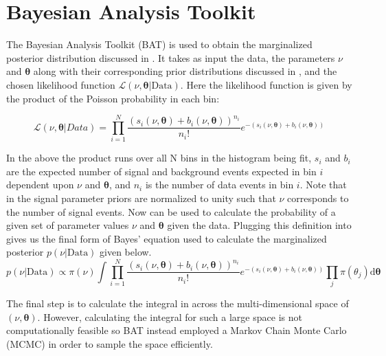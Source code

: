 \section{Bayesian Analysis Toolkit} \label{sec:fit:bat}

The Bayesian Analysis Toolkit (BAT) \cite{Beaujean:2011zz,Beresford:2642397} is
used to obtain the marginalized posterior distribution 
discussed in .  It takes as input the data, the parameters
$\nu$ and $\boldsymbol{\theta}$ along with their corresponding prior
distributions discussed in , and the chosen likelihood
function $\mathcal{L}(\nu,\boldsymbol{\theta}|\text{Data})$.  Here the
likelihood function is given by the product of the Poisson probability in each
bin: 

\begin{equation} \label{sec:fit:likelihood}
\mathcal{L}(\nu,\boldsymbol{\theta}|Data) = \prod_{i=1}^{N} \frac{(s_{i}(\nu,\boldsymbol{\theta}) + b_{i}(\nu,\boldsymbol{\theta}))^{n_{i}}}{n_{i}!} e^{-(s_{i}(\nu,\boldsymbol{\theta}) + b_{i}(\nu,\boldsymbol{\theta}))}
\end{equation}

In the above the product runs over all N bins in the histogram being fit,
$s_{i}$ and $b_{i}$ are the expected number of signal and background events
expected in bin $i$ dependent upon $\nu$ and $\boldsymbol{\theta}$, and $n_{i}$
is the number of data events in bin $i$.  Note that in 
the signal parameter priors are normalized to unity such that $\nu$ corresponds
to the number of signal events. Now  can be used to
calculate the probability of a given set of parameter values $\nu$ and
$\boldsymbol{\theta}$ given the data.  Plugging this definition into
 gives us the final form of Bayes' equation used to
calculate the marginalized posterior $p(\nu|\text{Data})$ given below.
%
\begin{equation} \label{sec:fit:full_bayes}
p(\nu|\text{Data}) \propto \pi(\nu) \int \prod_{i=1}^{N} \frac{(s_{i}(\nu,\boldsymbol{\theta}) + b_{i}(\nu,\boldsymbol{\theta}))^{n_{i}}}{n_{i}!} e^{-(s_{i}(\nu,\boldsymbol{\theta}) + b_{i}(\nu,\boldsymbol{\theta}))} \prod_{j}\pi(\theta_j)\text{d}\boldsymbol{\theta}
\end{equation}

The final step is to calculate the integral in  across
the multi-dimensional space of $(\nu,\boldsymbol{\theta})$. However, calculating the
integral for such a large space is not computationally feasible so BAT instead
employed a Markov Chain Monte Carlo (MCMC) \cite{Betancourt2017ACI,
Beresford:2642397} in order to sample the space efficiently.


